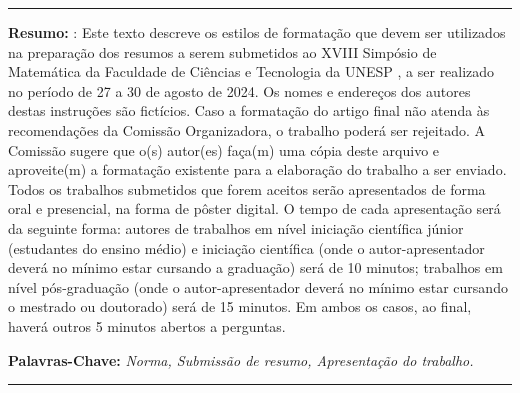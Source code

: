 \documentclass[12pt, a4paper]{article}
\begin{document}
\noindent \rule{17cm}{0.8pt}

\vspace*{0.3cm}

{\small \textbf{Resumo:} : Este texto descreve os estilos de formatação que devem ser utilizados na preparação dos resumos a serem submetidos ao XVIII Simpósio de Matemática da Faculdade de Ciências e Tecnologia da UNESP , a ser realizado no período de 27 a 30 de agosto de 2024. Os nomes e endereços dos autores destas instruções são fictícios. Caso a formatação do artigo final não atenda às recomendações da Comissão Organizadora, o trabalho poderá ser rejeitado. A Comissão sugere que o(s) autor(es) faça(m) uma cópia deste arquivo e aproveite(m) a formatação existente para a elaboração do trabalho a ser enviado. Todos os trabalhos submetidos que forem aceitos serão apresentados de forma oral e presencial, na forma de pôster digital. O tempo de cada apresentação será da seguinte forma: autores de trabalhos em nível iniciação científica júnior (estudantes do ensino médio) e iniciação científica (onde o autor-apresentador deverá no mínimo estar cursando a graduação) será de 10 minutos; trabalhos em nível pós-graduação (onde o autor-apresentador deverá no mínimo estar cursando o mestrado ou doutorado) será de 15 minutos. Em ambos os casos, ao final, haverá outros 5 minutos abertos a perguntas.
	\vspace*{0.3cm}	
	\par\textbf{Palavras-Chave:} \textit{Norma, Submissão de resumo, Apresentação do trabalho.}}
	

\noindent \rule{17cm}{0.8pt} 
\end{document}
